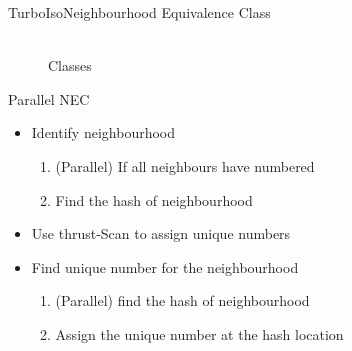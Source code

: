 \documentclass{beamer}
\begin{document}
\begin{frame}{TurboIso}{Neighbourhood Equivalence Class}
\begin{figure}[h!]
\begin{minipage}{.3\textwidth}
\\Classes
\end{minipage}
\end{figure}
%
%
\end{frame}
\begin{frame}
\begin{block}{Parallel NEC}
    \begin{itemize}
    \item Identify neighbourhood
    \begin{enumerate}
        \item(Parallel) If all neighbours have numbered
        \item Find the hash of neighbourhood
    \end{enumerate}
    \item Use thrust-Scan to assign unique numbers
    \item Find unique number for the neighbourhood
    \begin{enumerate}
        \item(Parallel) find the hash of neighbourhood
        \item Assign the unique number at the hash location
    \end{enumerate}
    \end{itemize}
\end{block}
\end{frame}
\end{document}
